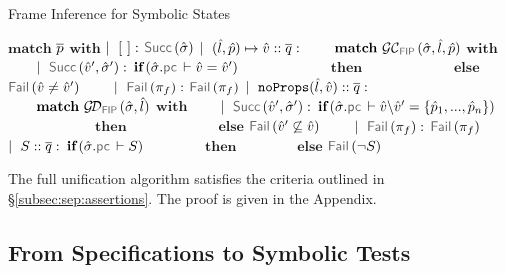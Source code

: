 {\footnotesize \begin{algorithm}[t!]
\caption{Frame Inference for Symbolic States}\label{fip:symb:states}
\begin{algorithmic}[1]
    \State $\textbf{match}$ $\overline{p}$ $\textbf{with}$
    \State $\mid~[ \ ]:$ \Return $\success{\sstate}$
    \State $\mid~(\hat{l}, \hat{p}) \mapsto \hat{v} :: \overline{q} :$ 
    \State $\qquad \textbf{match} \ \GetCellV{\sstate, \sloc, \sexprp}$ $\textbf{with}$
    \State $\qquad \mid~\success{\sexprv', \sstate'}:$ $\textbf{if} \,(\sstate.\pcsel \vdash \sexprv = \sexprv')$
     \State $\qquad \qquad \qquad ~  \textbf{then}$ \Return  {}
     \State $\qquad \qquad \qquad ~  \textbf{else}$ \Return $\fail{\sexprv \neq \sexprv'}$
      \State $\qquad \mid~\fail{\pc_f}:$ \Return $\fail{\pc_f}$
     \State $\mid~\texttt{noProps}(\hat{l}, \hat{v}) :: \overline{q} :$  
       \State $\qquad \textbf{match} \ \GetDomainV{\sstate, \sloc}$ $\textbf{with}$
       \State $\qquad \mid~\success{\sexprv', \sstate'}:$ $\textbf{if} \,(\sstate.\pcsel \vdash \sexprv \backslash \sexprv' = \{ \sexprp_1, ..., \sexprp_n \})$
        \State $\qquad \qquad \qquad ~  \textbf{then}$ \Return {}
       \State $\qquad \qquad \qquad ~  \textbf{else}$ \Return $\fail{\sexprv' \not\subseteq \sexprv }$
       \State $\qquad \mid~\fail{\pc_f}:$ \Return $\fail{\pc_f}$
     \State $\mid~S :: \overline{q} :$  $ \textbf{if} \,(\sstate.\pcsel \vdash \sass)$
       \State $\qquad \qquad \textbf{then}$ \Return  {}
      \State $\qquad \qquad \textbf{else}$  \Return $\fail{\neg \sass}$
\EndFunction
\end{algorithmic}
\end{algorithm}}



 The full unification algorithm satisfies the criteria outlined in \S\ref{subsec:sep:assertions}. The proof is given in the Appendix.



\subsection{From Specifications to Symbolic Tests}\label{specs:to:symbolic:tests}


